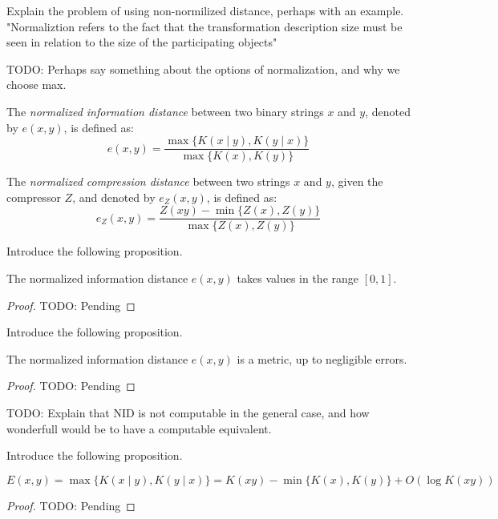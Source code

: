 {\color{red} Explain the problem of using non-normilized distance, perhaps with an example. "Normaliztion refers to the fact that the transformation description size must be seen in relation to the size of the participating objects"}

{\color{red} TODO: Perhaps say something about the options of normalization, and why we choose max.}

\begin{definition}
The \emph{normalized information distance} between two binary strings $x$ and $y$, denoted by $e(x, y)$, is defined as:
\[
e(x, y) = \frac{\max\{ K(x \mid y), K(y \mid x) \}}{\max \{ K(x), K(y) \} }
\]
\end{definition}

\begin{definition}
The \emph{normalized compression distance} between two strings $x$ and $y$, given the compressor $Z$, and denoted by $e_Z(x, y)$, is defined as:
\[
e_Z(x, y) = \frac{ Z(xy) - \min\{ Z(x), Z(y) \}}{\max \{ Z(x), Z(y) \} }
\]
\end{definition}

{\color{red} Introduce the following proposition.}

\begin{proposition}
\label{prop:ncd_between_zero_and_one}
The normalized information distance $e(x, y)$ takes values in the range $[0, 1]$.
\end{proposition}
\begin{proof}
{\color{red} TODO: Pending}
\end{proof}

{\color{red} Introduce the following proposition.}

\begin{proposition}
The normalized information distance $e(x, y)$ is a metric, up to negligible errors.
\end{proposition}
\begin{proof}
{\color{red} TODO: Pending}
\end{proof}

{\color{red} TODO: Explain that NID is not computable in the general case, and how wonderfull would be to have a computable equivalent.}

{\color{red} Introduce the following proposition.}

\begin{proposition}
\[
E(x, y) = \max\{ K(x \mid y), K(y \mid x) \} = K(xy) - \min\{ K(x), K(y) \} + O(\log K(xy) )
\]
\end{proposition}
\begin{proof}
{\color{red} TODO: Pending}
\end{proof}


